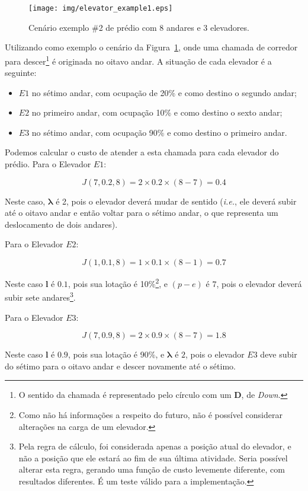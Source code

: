\begin{figure}[htb!]
  \centering
  \texttt{[image: img/elevator\_example1.eps]}
  \caption{Cenário exemplo \#2 de prédio com 8 andares e 3 elevadores.}
  \label{fig:elevadores-1}
\end{figure}

Utilizando como exemplo o cenário da Figura~\ref{fig:elevadores-1}, onde uma
chamada de corredor para descer\footnote{O sentido da chamada é representado
pelo círculo com um \textbf{D}, de \textit{Down}.} é originada no oitavo andar.
A situação de cada elevador é a seguinte:

\begin{itemize}\setlength\itemsep{0mm}
\item $E1$ no sétimo andar, com ocupação de 20\% e como destino o segundo andar;
\item $E2$ no primeiro andar, com ocupação 10\% e como destino o sexto andar;
\item $E3$ no sétimo andar, com ocupação 90\% e como destino o primeiro andar.
\end{itemize}

Podemos calcular o custo de atender a esta chamada para cada elevador do prédio.
Para o Elevador $E1$:

\[J(7, 0.2, 8) = 2 \times 0.2 \times (8 - 7) = 0.4\]

Neste caso, $\boldsymbol{\lambda}$ é 2, pois o elevador deverá mudar de sentido
(\textit{i.e.}, ele deverá subir até o oitavo andar e então voltar para o sétimo
andar, o que representa um deslocamento de dois andares).

Para o Elevador $E2$:

\[J(1, 0.1, 8) = 1 \times 0.1 \times (8 - 1) = 0.7\]

Neste caso $\boldsymbol{l}$ é $0.1$, pois sua lotação é 10\%\footnote{Como não
há informações a respeito do futuro, não é possível considerar alterações na
carga de um elevador.}, e $(p - e)$ é $7$, pois o elevador deverá subir sete
andares\footnote{Pela regra de cálculo, foi considerada apenas a posição atual
do elevador, e não a posição que ele estará ao fim de sua última atividade.
Seria possível alterar esta regra, gerando uma função de custo levemente
diferente, com resultados diferentes. É um teste válido para a implementação.}.

Para o Elevador $E3$:

\[J(7, 0.9, 8) = 2 \times 0.9\times (8 - 7) = 1.8\]

Neste caso $\boldsymbol{l}$ é $0.9$, pois sua lotação é 90\%, e
$\boldsymbol{\lambda}$ é $2$, pois o elevador $E3$ deve subir do sétimo para o
oitavo andar e descer novamente até o sétimo.

